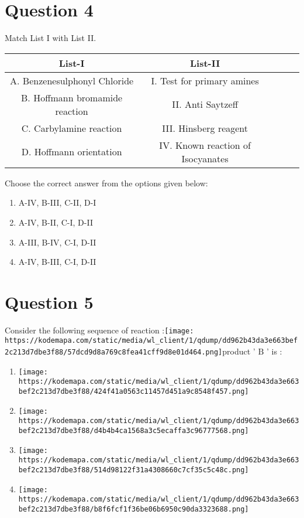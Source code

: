 \documentclass{article}
\begin{document}
\begin{enumerate}[label=(\alph*)]
\end{enumerate}
\newpage
\section*{Question 4}
Match List I with List II.\begin{tabular}{|c|c|c|c|c|}
\hline
List-I & List-II \\
\hline
A. Benzenesulphonyl Chloride & I. Test for primary amines \\
\hline
B. Hoffmann bromamide reaction & II. Anti Saytzeff \\
\hline
C. Carbylamine reaction & III. Hinsberg reagent \\
\hline
D. Hoffmann orientation & IV. Known reaction of Isocyanates \\
\hline
\end{tabular}
Choose the correct answer from the options given below: \newline
\begin{enumerate}[label=(\alph*)]
\item A-IV, B-III, C-II, D-I
\item A-IV, B-II, C-I, D-II
\item A-III, B-IV, C-I, D-II
\item A-IV, B-III, C-I, D-II
\end{enumerate}
\newpage
\section*{Question 5}
Consider the following sequence of reaction :\texttt{[image: https://kodemapa.com/static/media/wl\_client/1/qdump/dd962b43da3e663bef2c213d7dbe3f88/57dcd9d8a769c8fea41cff9d8e01d464.png]}\newlineThe product ' \(\mathrm{B}\) ' is : 
\begin{enumerate}[label=(\alph*)]
\item \texttt{[image: https://kodemapa.com/static/media/wl\_client/1/qdump/dd962b43da3e663bef2c213d7dbe3f88/424f41a0563c11457d451a9c8548f457.png]}
\item \texttt{[image: https://kodemapa.com/static/media/wl\_client/1/qdump/dd962b43da3e663bef2c213d7dbe3f88/d4b4b4ca1568a3c5ecaffa3c96777568.png]}
\item \texttt{[image: https://kodemapa.com/static/media/wl\_client/1/qdump/dd962b43da3e663bef2c213d7dbe3f88/514d98122f31a4308660c7cf35c5c48c.png]}
\item \texttt{[image: https://kodemapa.com/static/media/wl\_client/1/qdump/dd962b43da3e663bef2c213d7dbe3f88/b8f6fcf1f36be06b6950c90da3323688.png]}
\end{enumerate}
\newpage
\end{document}
